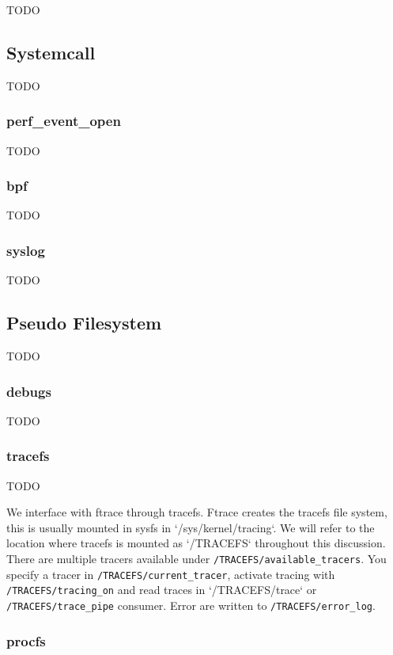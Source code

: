 TODO

\subsection{Systemcall}

TODO

\subsubsection*{perf\_event\_open}

TODO

\subsubsection*{bpf}

TODO

\subsubsection*{syslog}

TODO

\subsection{Pseudo Filesystem}

TODO

\subsubsection*{debugs}

TODO

\subsubsection*{tracefs}

TODO


We interface with ftrace through tracefs. Ftrace creates the tracefs file
system, this is usually mounted in sysfs in `/sys/kernel/tracing`. We will refer
to the location where tracefs is mounted as `/TRACEFS` throughout this
discussion. There are multiple tracers available under
\verb|/TRACEFS/available_tracers|.  You specify a tracer in
\verb|/TRACEFS/current_tracer|, activate tracing with \verb|/TRACEFS/tracing_on|
and read traces in `/TRACEFS/trace` or \verb|/TRACEFS/trace_pipe|
consumer. Error are written to \verb|/TRACEFS/error_log|.


\subsubsection*{procfs}

